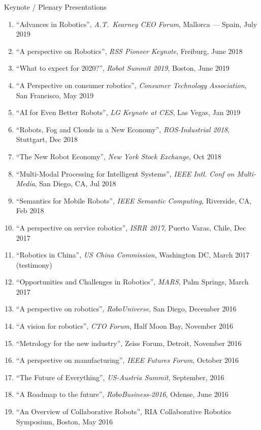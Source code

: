 \documentclass{article}
\begin{document}
\begin{cv}
\begin{cvlist}{Keynote / Plenary Presentations}
\begin{enumerate}
{					      IEEE Intl.\ Symp.\ on Safety, Security and Rescue Robotics}, Wurzburg, Sept. 2019.
			\item  ``Advances in Robotics'', {\em A.T.\ Kearney CEO Forum}, Mallorca --- Spain, July 2019
			\item ``A perspective on Robotics'', {\em RSS Pioneer Keynote}, Freiburg, June 2018
			\item ``What to expect for 2020?'', {\em Robot Summit 2019}, Boston, June 2019
			\item ``A Perspective on consumer robotics'', {\em Consumer Technology Association}, San Francisco, May 2019
			\item ``AI for Even Better Robots'', {\em LG Keynote at CES}, Las Vegas, Jan 2019
			\item ``Robots, Fog and Clouds in a New Economy'', {\em ROS-Industrial 2018}, Stuttgart, Dec 2018
			\item ``The New Robot Economy'', {\em New York Stock Exchange}, Oct 2018
			\item ``Multi-Modal Processing for Intelligent Systems'', {\em IEEE Intl. Conf on Multi-Media},
			      San Diego, CA, Jul 2018
			\item ``Semantics for Mobile Robots'', {\em IEEE Semantic Computing}, Riverside, CA, Feb 2018
			\item ``A perspective on service robotics'', {\em ISRR 2017}, Puerto Varas, Chile, Dec 2017
			\item ``Robotics in China'', {\em US China Commission}, Washington DC, March 2017 (testimony)
			\item ``Opportunities and Challenges in Robotics'', {\em MARS}, Palm Springs, March 2017
			\item ``A perspective on robotics'', {\em RoboUniverse}, San Diego,  December 2016
			\item ``A vision for robotics'', {\em CTO Forum}, Half Moon Bay, November 2016
			\item ``Metrology for the new industry'', Zeiss Forum, Detroit,  November 2016
			\item ``A perspective on manufacturing'', {\em IEEE Futures Forum},  October 2016
			\item ``The Future of Everything'', {\em US-Austria Summit},  September, 2016
			\item ``A Roadmap to the future'', {\em RoboBusiness-2016}, Odense,  June 2016
			\item ``An Overview of Collaborative Robots'', RIA Collaborative Robotics Symposium, Boston, May 2016

\end{enumerate}
\end{cvlist}
\end{cv}
\end{document}
